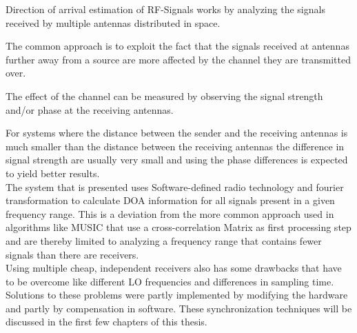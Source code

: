 Direction of arrival estimation of RF-Signals
works by analyzing the signals received by
multiple antennas distributed in space.

The common approach is to exploit the fact
that the signals received at antennas further
away from a source are more affected by the channel
they are transmitted over.

The effect of the channel can be measured by
observing the signal strength and/or phase
at the receiving antennas.

For systems where the distance between
the sender and the receiving antennas is much
smaller than the distance between the receiving
antennas the difference in signal strength
are usually very small and using the phase
differences is expected to yield better results. \\

The system that is presented uses Software-defined radio
technology and fourier transformation to calculate DOA
information for all signals present in a given frequency range.
This is a deviation from the more common approach
used in algorithms like MUSIC that use a
cross-correlation Matrix as first processing step and are
thereby limited to analyzing a frequency range that contains
fewer signals than there are receivers. \\

Using multiple cheap, independent receivers also
has some drawbacks that have to be overcome like
different LO frequencies and differences in sampling
time. Solutions to these problems were partly implemented
by modifying the hardware and partly by compensation
in software.
These synchronization techniques will be discussed
in the first few chapters of this thesis.
